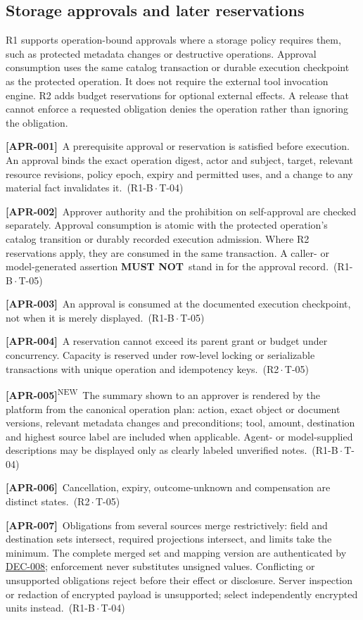 \documentclass[11pt,a4paper]{article}
\newcommand{\mustnot}{\textbf{MUST NOT}}
\newcommand{\rr}[1]{\hyperlink{req:#1}{#1}}
\newcommand{\reqtag}[2]{{\footnotesize\color{accent}(#1\,$\cdot$\,#2)}}
\newcommand{\req}[4]{\par\noindent\hypertarget{req:#1}{\textbf{[#1]}}\ #4\ \reqtag{#2}{#3}\par}
\newcommand{\reqn}[4]{\par\noindent\hypertarget{req:#1}{\textbf{[#1]}}\textsuperscript{\color{accent}\tiny NEW}\ #4\ \reqtag{#2}{#3}\par}
\begin{document}
\subsection{Storage approvals and later reservations}
R1 supports operation-bound approvals where a storage policy requires them, such as protected metadata changes or destructive operations. Approval consumption uses the same catalog transaction or durable execution checkpoint as the protected operation. It does not require the external tool invocation engine. R2 adds budget reservations for optional external effects. A release that cannot enforce a requested obligation denies the operation rather than ignoring the obligation.
\req{APR-001}{R1-B}{T-04}{A prerequisite approval or reservation is satisfied before execution. An approval binds the exact operation digest, actor and subject, target, relevant resource revisions, policy epoch, expiry and permitted uses, and a change to any material fact invalidates it.}
\req{APR-002}{R1-B}{T-05}{Approver authority and the prohibition on self-approval are checked separately. Approval consumption is atomic with the protected operation's catalog transition or durably recorded execution admission. Where R2 reservations apply, they are consumed in the same transaction. A caller- or model-generated assertion \mustnot\ stand in for the approval record.}
\req{APR-003}{R1-B}{T-05}{An approval is consumed at the documented execution checkpoint, not when it is merely displayed.}
\req{APR-004}{R2}{T-05}{A reservation cannot exceed its parent grant or budget under concurrency. Capacity is reserved under row-level locking or serializable transactions with unique operation and idempotency keys.}
\reqn{APR-005}{R1-B}{T-04}{The summary shown to an approver is rendered by the platform from the canonical operation plan: action, exact object or document versions, relevant metadata changes and preconditions; tool, amount, destination and highest source label are included when applicable. Agent- or model-supplied descriptions may be displayed only as clearly labeled unverified notes.}
\req{APR-006}{R2}{T-05}{Cancellation, expiry, outcome-unknown and compensation are distinct states.}
\req{APR-007}{R1-B}{T-04}{Obligations from several sources merge restrictively: field and destination sets intersect, required projections intersect, and limits take the minimum. The complete merged set and mapping version are authenticated by \rr{DEC-008}; enforcement never substitutes unsigned values. Conflicting or unsupported obligations reject before their effect or disclosure. Server inspection or redaction of encrypted payload is unsupported; select independently encrypted units instead.}
\end{document}
